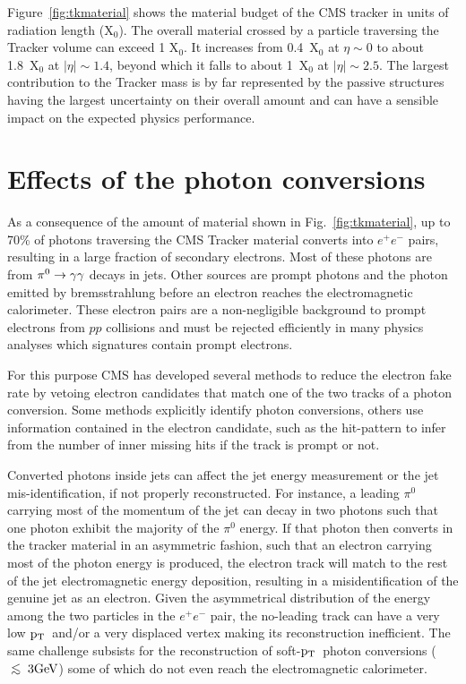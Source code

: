 \documentclass[a4paper]{jpconf}
\def\centeron#1#2{{\setbox0=\hbox{#1}\setbox1=\hbox{#2}\ifdim
\wd1>\wd0\kern.5\wd1\kern-.5\wd0\fi
\copy0\kern-.5\wd0\kern-.5\wd1\copy1\ifdim\wd0>\wd1
\kern.5\wd0\kern-.5\wd1\fi}}
\def\ltap{\;\centeron{\raise.35ex\hbox{$<$}}{\lower.65ex\hbox{$\sim$}}\;}
\def\lsim{\mathrel{\ltap}}
\def \pt{$\p_{\rm T}$~}
\begin{document}
Figure~\ref{fig:tkmaterial} shows the material budget of the CMS tracker in units of radiation length (X$_0$). 
The overall material crossed by a particle traversing the Tracker volume can exceed 1 X$_0$. 
It increases from 0.4~X$_0$ at $\eta \sim 0$ to about 1.8~X$_0$ at $|\eta| \sim 1.4$, beyond which it falls to about 1~X$_0$ at $|\eta| \sim 2.5$.
The largest contribution to the Tracker mass is by far represented by the passive structures having the largest uncertainty on their overall amount and can have a sensible impact on the expected physics performance. 



\section{Effects of the photon conversions}


As a consequence  of the amount of material shown in Fig.~\ref{fig:tkmaterial}, up to 70\% of photons traversing the CMS Tracker material converts into  $e^+ e^-$ pairs, resulting in a large fraction of secondary electrons. 
Most of these photons are from ${\rm \pi^0}  \to \gamma\gamma$ decays in jets. Other sources are prompt photons and the photon emitted by bremsstrahlung before an electron reaches the electromagnetic calorimeter. 
These electron pairs are  a non-negligible background to prompt electrons from $pp$ collisions and must be rejected efficiently in many physics analyses which signatures contain prompt electrons.

For this purpose 
CMS has developed several methods  to reduce the electron fake rate by  vetoing electron candidates that match one of the two tracks of a photon conversion. Some methods explicitly identify photon conversions, others use information contained in the electron candidate,  such as the hit-pattern to infer from the  number of inner missing hits if the track is prompt or not.

	
Converted photons inside jets can affect  the jet energy measurement or the jet mis-identification, if not properly reconstructed. 
For instance, a leading $\pi^0$ carrying most of the momentum of the jet can decay in two photons such that one photon exhibit the majority of the $\pi^0$ energy. If that photon then converts in the tracker material in an asymmetric fashion, such that an electron carrying most of the photon energy is produced, the electron track will match to the rest of the jet electromagnetic energy deposition, resulting in a misidentification of the genuine jet as an electron.
%
Given the asymmetrical distribution of the energy among the two particles in the $e^+ e^-$ pair, the no-leading track can have a very low \pt and/or a very displaced vertex making its 
 reconstruction inefficient.
 The same challenge subsists for the reconstruction of soft-\pt photon conversions ($\rm \lsim 3 GeV$) some of which do not even reach the electromagnetic calorimeter.
\end{document}
